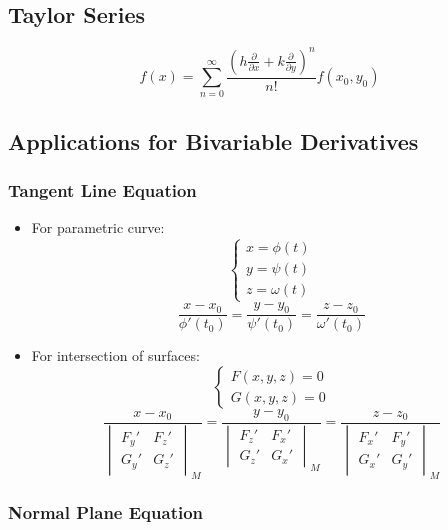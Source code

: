 \documentclass{article}
\begin{document}
\subsection{Taylor Series}

\[
    f(x) = \sum_{n=0}^{\infty} \frac{\left(h\frac{\partial}{\partial x} + k\frac{\partial}{\partial y}\right)^n}{n!} f(x_0, y_0)
\]

\subsection{Applications for Bivariable Derivatives}

\subsubsection{Tangent Line Equation}

\begin{itemize}
    \item For parametric curve:
    \[
        \begin{cases}
            x = \phi(t) \\
            y = \psi(t) \\
            z = \omega(t)
        \end{cases}
    \]
    \[
        \frac{x - x_0}{\phi'(t_0)} = \frac{y - y_0}{\psi'(t_0)} = \frac{z - z_0}{\omega'(t_0)}
    \]

    \item For intersection of surfaces:
    \[
        \begin{cases}
            F(x, y, z) = 0 \\
            G(x, y, z) = 0
        \end{cases}
    \]
    \[
        \frac{x - x_0}{\begin{vmatrix} F_y' & F_z' \\ G_y' & G_z' \end{vmatrix}_M} = \frac{y - y_0}{\begin{vmatrix} F_z' & F_x' \\ G_z' & G_x' \end{vmatrix}_M} = \frac{z - z_0}{\begin{vmatrix} F_x' & F_y' \\ G_x' & G_y' \end{vmatrix}_M}
    \]
\end{itemize}

\subsubsection{Normal Plane Equation}
\end{document}
